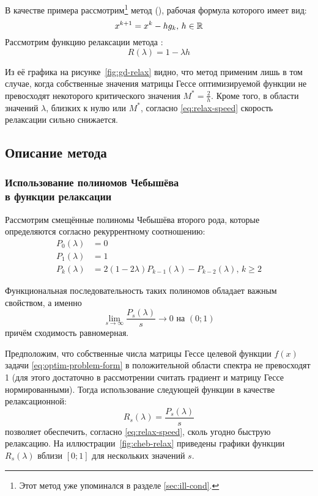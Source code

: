 В качестве примера рассмотрим\footnote{Этот метод уже упоминался в
  разделе \ref{sec:ill-cond}.} метод  (\gd{}), рабочая формула которого имеет вид:
\begin{equation}
  \label{eq:gd-workhorse}
  x^{k+1}=x^k-hg_k,\, h\in\mathbb{R}
\end{equation}
Рассмотрим функцию релаксации метода \gd{}:
\begin{equation}
  \label{eq:gd-relax}
  R(\lambda) = 1 - \lambda h
\end{equation}



Из её графика на рисунке \ref{fig:gd-relax} видно, что метод применим
лишь в том случае, когда собственные значения матрицы Гессе
оптимизируемой функции не превосходят некоторого критического значения
$M^*=\frac{2}{h}$. Кроме того, в области значений $\lambda$, близких к
нулю или $M^*$, согласно \eqref{eq:relax-speed} скорость релаксации
сильно снижается.

\subsection{Описание метода \relch{}}

\subsubsection{Использование полиномов Чебышёва\\
  в функции релаксации}

Рассмотрим смещённые полиномы Чебышёва второго рода, которые
определяются согласно рекуррентному соотношению:
\begin{align}
  \label{eq:chebyshev}
  P_0(\lambda) &= 0 \\
  P_1(\lambda) &= 1 \\
  P_k(\lambda) &= 2(1-2\lambda)P_{k-1}(\lambda) - P_{k-2}(\lambda),\, k
  \geq 2
\end{align}

Функциональная последовательность таких полиномов обладает важным
свойством, а именно
\begin{equation}
  \label{eq:cheb-limit}
  \lim_{s\to\infty}{\frac{P_s(\lambda)}{s}} \to 0 \text{ на } (0;1)
\end{equation}
причём сходимость равномерная.

Предположим, что собственные числа матрицы Гессе целевой функции
$f(x)$ задачи \eqref{eq:optim-problem-form} в положительной области
спектра не превосходят 1 (для этого достаточно в рассмотрении считать
градиент и матрицу Гессе нормированными). Тогда использование
следующей функции в качестве релаксационной:
\begin{equation}
  \label{eq:cheb-relax}
  R_s(\lambda) = \frac{P_s(\lambda)}{s}
\end{equation}
позволяет обеспечить, согласно \eqref{eq:relax-speed}, сколь угодно
быструю релаксацию. На иллюстрации \ref{fig:cheb-relax} приведены
графики функции $R_s(\lambda)$ вблизи $[0;1]$ для нескольких значений
$s$.

